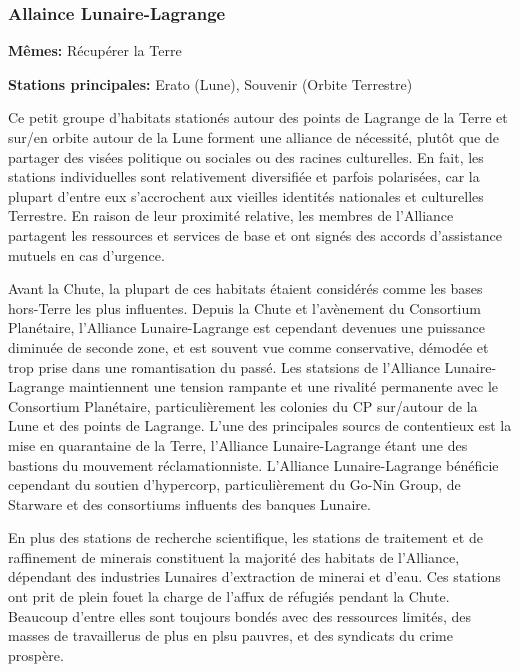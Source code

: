                            \subsubsection{Allaince Lunaire-Lagrange} \label{sec:lunar-lagr-alli} 

                           \textbf{Mêmes:} Récupérer la Terre 

                           \textbf{Stations principales:} Erato (Lune), Souvenir (Orbite Terrestre) 

                           Ce petit groupe d'habitats stationés autour des points de Lagrange de la Terre et sur/en orbite autour de la Lune forment une alliance de nécessité, plutôt que de partager des visées politique ou sociales ou des racines culturelles. En fait, les stations individuelles sont relativement diversifiée et parfois polarisées, car la plupart d'entre eux s'accrochent aux vieilles identités nationales et culturelles Terrestre. En raison de leur proximité relative, les membres de l'Alliance partagent les ressources et services de base et ont signés des accords d'assistance mutuels en cas d'urgence. 

                           Avant la Chute, la plupart de ces habitats étaient considérés comme les bases hors-Terre les plus influentes. Depuis la Chute et l'avènement du Consortium Planétaire, l'Alliance Lunaire-Lagrange est cependant devenues une puissance diminuée de seconde zone, et est souvent vue comme conservative, démodée et trop prise dans une romantisation du passé. Les statsions de l'Alliance Lunaire-Lagrange maintiennent une tension rampante et une rivalité permanente avec le Consortium Planétaire, particulièrement les colonies du CP sur/autour de la Lune et des points de Lagrange. L'une des principales sourcs de contentieux est la mise en quarantaine de la Terre, l'Alliance Lunaire-Lagrange étant une des bastions du mouvement réclamationniste. L'Alliance Lunaire-Lagrange bénéficie cependant du soutien d'hypercorp, particulièrement du Go-Nin Group, de Starware et des consortiums influents des banques Lunaire. 

                           En plus des stations de recherche scientifique, les stations de traitement et de raffinement de minerais constituent la majorité des habitats de l'Alliance, dépendant des industries Lunaires d'extraction de minerai et d'eau. Ces stations ont prit de plein fouet la charge de l'affux de réfugiés pendant la Chute. Beaucoup d'entre elles sont toujours bondés avec des ressources limités, des masses de travaillerus de plus en plsu pauvres, et des syndicats du crime prospère. 

